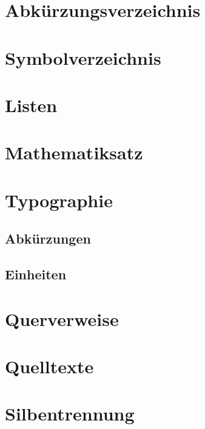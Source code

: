 \documentclass[english,ngerman]{tudscrartcl}
\begin{document}
\section{Abkürzungsverzeichnis}

\section{Symbolverzeichnis}

\section{Listen}

\section{Mathematiksatz}

\section{Typographie}
\subsection{Abkürzungen}
\subsection{Einheiten}

\section{Querverweise}

\section{Quelltexte}

\section{Silbentrennung}
\end{document}
